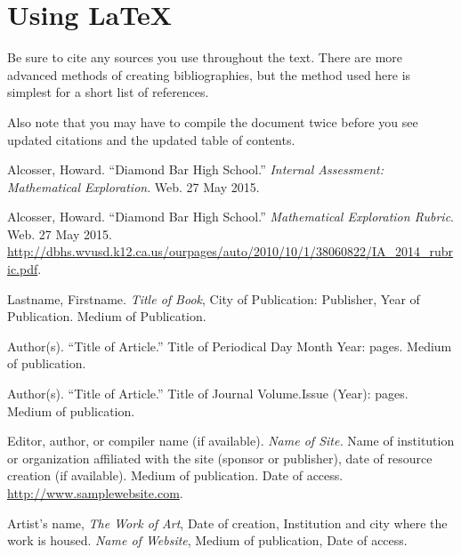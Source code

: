 \documentclass[11pt]{article}
\begin{document}
\section{Using \LaTeX{}}

Be sure to cite any sources you use throughout the text. 
There are more advanced methods of creating bibliographies, 
but the method used here is simplest for a short list of references.

Also note that you may have to compile the document twice 
before you see updated citations and the updated table of contents.

\pagebreak
\begin{thebibliography}{}

Alcosser, Howard.  
``Diamond Bar High School.''  
\textit{Internal Assessment: Mathematical Exploration}.  
Web. 27 May 2015.

Alcosser, Howard.  
``Diamond Bar High School.''  
\textit{Mathematical Exploration Rubric}.  
Web. 27 May 2015.  
\url{http://dbhs.wvusd.k12.ca.us/ourpages/auto/2010/10/1/38060822/IA_2014_rubric.pdf}.

Lastname, Firstname.  
\textit{Title of Book},  
City of Publication:  
Publisher,  
Year of Publication.  
Medium of Publication.

Author(s).  
``Title of Article.''  
Title of Periodical  
Day Month Year:  
pages.  
Medium of publication.

Author(s).  
``Title of Article.''  
Title of Journal  
Volume.Issue (Year):  
pages.  
Medium of publication.

Editor, author, or compiler name (if available).  
\textit{Name of Site.}  
Name of institution or organization affiliated with the site (sponsor or publisher),  
date of resource creation (if available).  
Medium of publication.  
Date of access.  
\url{http://www.samplewebsite.com}.

Artist's name,  
\textit{The Work of Art},  
Date of creation,  
Institution and city where the work is housed.  
\textit{Name of Website},  
Medium of publication,  
Date of access.

\end{thebibliography}
\end{document}
